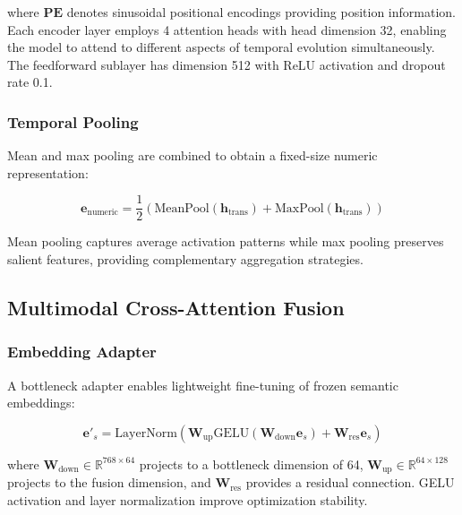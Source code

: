 \documentclass{sn-jnl}
\begin{document}
where $\mathbf{PE}$ denotes sinusoidal positional encodings providing position information. Each encoder layer employs 4 attention heads with head dimension 32, enabling the model to attend to different aspects of temporal evolution simultaneously. The feedforward sublayer has dimension 512 with ReLU activation and dropout rate 0.1.

\subsubsection{Temporal Pooling}
\label{subsubsec:pooling}

Mean and max pooling are combined to obtain a fixed-size numeric representation:

\begin{equation}
\label{eq:pooling}
    \mathbf{e}_{\text{numeric}} = \frac{1}{2}\left(\text{MeanPool}(\mathbf{h}_{\text{trans}}) + \text{MaxPool}(\mathbf{h}_{\text{trans}})\right)
\end{equation}

Mean pooling captures average activation patterns while max pooling preserves salient features, providing complementary aggregation strategies.

\subsection{Multimodal Cross-Attention Fusion}
\label{subsec:fusion}

\subsubsection{Embedding Adapter}
\label{subsubsec:adapter}

A bottleneck adapter enables lightweight fine-tuning of frozen semantic embeddings:

\begin{equation}
\label{eq:adapter}
    \mathbf{e}'_s = \text{LayerNorm}(\mathbf{W}_{\text{up}} \text{GELU}(\mathbf{W}_{\text{down}} \mathbf{e}_s) + \mathbf{W}_{\text{res}} \mathbf{e}_s)
\end{equation}

where $\mathbf{W}_{\text{down}} \in \mathbb{R}^{768 \times 64}$ projects to a bottleneck dimension of 64, $\mathbf{W}_{\text{up}} \in \mathbb{R}^{64 \times 128}$ projects to the fusion dimension, and $\mathbf{W}_{\text{res}}$ provides a residual connection. GELU activation and layer normalization improve optimization stability.
\end{document}
